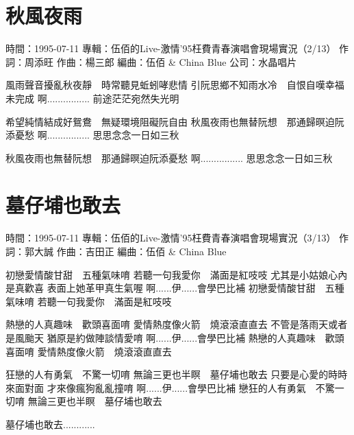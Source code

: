 \documentclass[UTF8,a4paper,oneside,twocolumn,12pt]{ctexbook}
\newcommand{\infopair}[2]{\textbullet #1：#2}
\newcommand{\zc}[1][伍佰]{\infopair{作詞}{#1}}
\newcommand{\zq}[1][伍佰]{\infopair{作曲}{#1}}
\newcommand{\bq}[1][伍佰]{\infopair{編曲}{#1}}
\newcommand{\zj}[1]{\infopair{專輯}{#1}}
\newcommand{\sj}[1]{\infopair{時間}{#1}}
\newenvironment{info}{\begin{flushleft}\kaishu
	}
	{\end{flushleft}\normalsize\yahei\par}
\newenvironment{lyric}{
	}
{}
\begin{document}
\section{秋風夜雨}
\begin{info}
	\sj{1995-07-11}
	\zj{伍佰的Live-激情'95枉費青春演唱會現場實況（2/13）}
	\zc[周添旺]
	\zq[楊三郎]
	\bq[伍佰 \& China Blue]
	\infopair{公司}{水晶唱片}
\end{info}
\begin{lyric}
	風雨聲音擾亂秋夜靜　時常聽見蚯蚓哮悲情
	引阮思鄉不知雨水冷　自恨自嘆幸福未完成
	啊................  前途茫茫宛然失光明

	希望純情結成好鴛鴦　無疑環境阻礙阮自由
	秋風夜雨也無替阮想　那通歸暝迫阮添憂愁
	啊................  思思念念一日如三秋

	秋風夜雨也無替阮想　那通歸暝迫阮添憂愁
	啊................  思思念念一日如三秋
\end{lyric}

\section{墓仔埔也敢去}
\begin{info}
	\sj{1995-07-11}
	\zj{伍佰的Live-激情'95枉費青春演唱會現場實況（3/13）}
	\zc[郭大誠]
	\zq[吉田正]
	\bq[伍佰 \& China Blue]
\end{info}
\begin{lyric}
	初戀愛情酸甘甜　五種氣味唷
	若聽一句我愛你　滿面是紅吱吱
	尤其是小姑娘心內是真歡喜
	表面上她革甲真生氣喔
	啊......伊......會學巴比補
	初戀愛情酸甘甜　五種氣味唷
	若聽一句我愛你　滿面是紅吱吱

	熱戀的人真趣味　歡頭喜面唷
	愛情熱度像火箭　燒滾滾直直去
	不管是落雨天或者是風颱天
	猶原是約做陣談情愛唷
	啊......伊......會學巴比補
	熱戀的人真趣味　歡頭喜面唷
	愛情熱度像火箭　燒滾滾直直去

	狂戀的人有勇氣　不驚一切唷
	無論三更也半瞑　墓仔埔也敢去
	只要是心愛的時時來面對面
	才來像瘋狗亂亂撞唷
	啊......伊......會學巴比補
	戀狂的人有勇氣　不驚一切唷
	無論三更也半瞑　墓仔埔也敢去

	墓仔埔也敢去............
\end{lyric}
\end{document}
